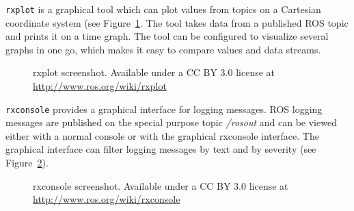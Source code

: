 \texttt{rxplot} is a graphical tool which can plot values from topics on a Cartesian coordinate system (see Figure~\ref{rxplot_screenshot}. The tool takes data from a published ROS topic and prints it on a time graph. The tool can be configured to visualize several graphs in one go, which makes it easy to compare values and data streams.

\begin{figure}[h]
  \centering
  \caption{rxplot screenshot. Available under a CC BY 3.0 license at \url{http://www.ros.org/wiki/rxplot}}
  \label{rxplot_screenshot}
\end{figure}

\texttt{rxconsole} provides a graphical interface for logging messages. ROS logging messages are published on the special purpose topic \emph{/rosout} and can be viewed either with a normal console or with the graphical rxconsole interface. The graphical interface can filter logging messages by text and by severity (see Figure~\ref{rxconsole_screenshot}).

\begin{figure}[p]
  \centering
  \caption{rxconsole screenshot. Available under a CC BY 3.0 license at \url{http://www.ros.org/wiki/rxconsole}}
  \label{rxconsole_screenshot}
\end{figure}



